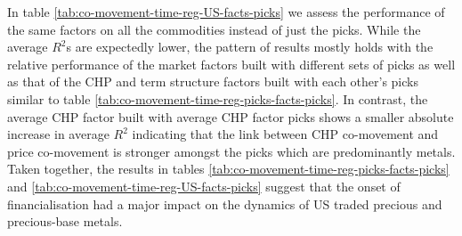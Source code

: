 \documentclass[]{elsarticle} %
\begin{document}
In table \ref{tab:co-movement-time-reg-US-facts-picks} we assess the performance of the same factors on all the commodities instead of just the picks. While the average \(R^{2}\)s are expectedly lower, the pattern of results mostly holds with the relative performance of the market factors built with different sets of picks as well as that of the CHP and term structure factors built with each other's picks similar to table \ref{tab:co-movement-time-reg-picks-facts-picks}. In contrast, the average CHP factor built with average CHP factor picks shows a smaller absolute increase in average \(R^{2}\) indicating that the link between CHP co-movement and price co-movement is stronger amongst the picks which are predominantly metals. Taken together, the results in tables \ref{tab:co-movement-time-reg-picks-facts-picks} and \ref{tab:co-movement-time-reg-US-facts-picks} suggest that the onset of financialisation had a major impact on the dynamics of US traded precious and precious-base metals.\\
\end{document}
